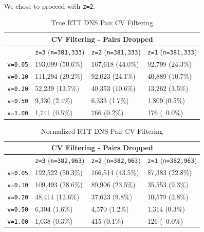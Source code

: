 We chose to proceed with \texttt{z=2}.

\begin{table}[H]
    \centering
    \begin{tabular}{ |p{1.6cm}|p{4cm}|p{4cm}|p{4cm}| }
        \hline
        \multicolumn{4}{|c|}{CV Filtering - Pairs Dropped} \\
        \hline
         & \texttt{z=3} (\texttt{n=381,333}) & \texttt{z=2} (\texttt{n=381,333}) & \texttt{z=1} (\texttt{n=381,333}) \\
        \hline
        \texttt{v=0.05} & 193,099 (50.6\%)  & 167,618 (44.0\%) & ‭92,799 (24.3\%) \\
        \texttt{v=0.10} & 111,294 (29.2\%) & 92,023 (24.1\%) & 40,889 (10.7\%)‬\\
        \texttt{v=0.20} & 52,239 (13.7\%) &  40,353 (10.6\%) & 13,262 (3.5\%)\\
        \texttt{v=0.50} & 9,330 (2.4\%) &  6,333 (1.7\%) & 1,809 (0.5\%)\\
        \texttt{v=1.00} & 1,741 (0.5\%) &    766 (0.2\%) & 176 (~0.0\%) \\
        \hline
    \end{tabular}
    \caption{True RTT DNS Pair CV Filtering}
    \label{tab:dns_unnorm_cv_filtering}
\end{table}

\begin{table}[H]
    \centering
    \begin{tabular}{ |p{1.6cm}|p{4cm}|p{4cm}|p{4cm}| }
        \hline
        \multicolumn{4}{|c|}{CV Filtering - Pairs Dropped} \\
        \hline
         & \texttt{z=3} (\texttt{n=382,963}) & \texttt{z=2} (\texttt{n=382,963}) & \texttt{z=1} (\texttt{n=382,963}) \\
        \hline
        \texttt{v=0.05} & 192,522 (50.3\%) & 166,514 (43.5\%) & 87,383 (22.8\%) \\
        \texttt{v=0.10} & 109,493 (28.6\%) & 89,906 (23.5\%) & 35,553 (9.3\%) \\
        \texttt{v=0.20} & 48,414 (12.6\%) & 37,623 (9.8\%) & 10,579 (2.8\%) \\
        \texttt{v=0.50} & 6,304 (1.6\%) & 4,570 (1.2\%) & 1,314 (0.3\%) \\
        \texttt{v=1.00} & 1,038 (0.3\%) &    415 (0.1\%) & 126 (~0.0\%) \\  
        \hline
    \end{tabular}
    \caption{Normalized RTT DNS Pair CV Filtering}
    \label{tab:dns_norm_cv_filtering}
\end{table}

